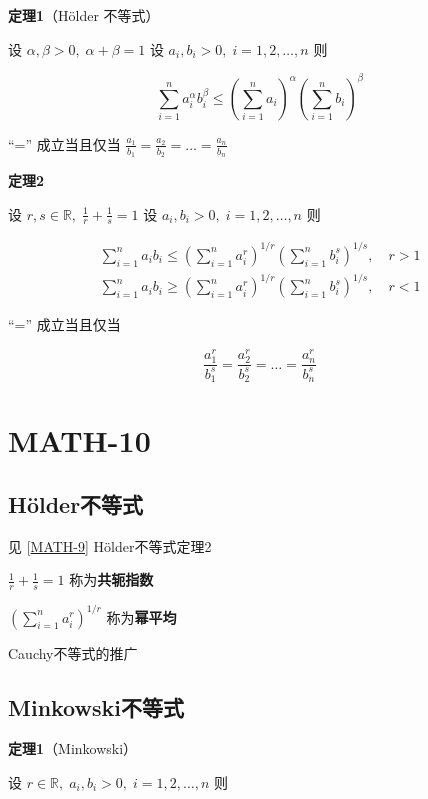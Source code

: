 \textbf{定理1}（Hölder 不等式）

设 \(\alpha,\beta >0, \; \alpha + \beta =1\) 设
\(a_{i}, b_{i}>0, \; i=1, 2, \dots , n\) 则

\[
\sum_{i=1}^{n}a_{i}^{\alpha}b_{i}^{\beta}\leq \left( \sum_{i=1}^{n}a_{i} \right)^{\alpha}\left( \sum_{i=1}^{n}b_{i} \right)^{\beta}
\]

``='' 成立当且仅当
\(\frac{a_{1}}{b_{1}}=\frac{a_{2}}{b_{2}}=\dots=\frac{a_{n}}{b_{n}}\)

\textbf{定理2}

设 \(r,s \in \mathbb{R}, \; \frac{1}{r}+\frac{1}{s}=1\) 设
\(a_{i},b_{i}>0, \; i=1,2,\dots,n\) 则

\[
\begin{aligned}
\sum_{i=1}^{n}a_{i}b_{i}\leq\left( \sum_{i=1}^{n}a_{i}^{r} \right)^{1/r}\left( \sum_{i=1}^{n}b_{i}^{s} \right)^{1/s}, \quad r>1 \\
\sum_{i=1}^{n}a_{i}b_{i}\geq\left( \sum_{i=1}^{n}a_{i}^{r} \right)^{1/r}\left( \sum_{i=1}^{n}b_{i}^{s} \right)^{1/s}, \quad r<1
\end{aligned}
\]

``='' 成立当且仅当

\[
\frac{a_{1}^{r}}{b_{1}^{s}}=\frac{a_{2}^{r}}{b_{2}^{s}}=\dots=\frac{a_{n}^{r}}{b_{n}^{s}}
\]

\section{MATH-10}\label{math-10}

\subsection{Hölder不等式}\label{huxf6lderux4e0dux7b49ux5f0f-1}

见 {[}\hyperref[math-9]{MATH-9}{]} Hölder不等式定理2

\(\frac{1}{r}+\frac{1}{s}=1\) 称为\textbf{共轭指数}

\(\left( \sum_{i=1}^{n}a_{i}^{r} \right)^{1/r}\) 称为\textbf{幂平均}

Cauchy不等式的推广

\subsection{Minkowski不等式}\label{minkowskiux4e0dux7b49ux5f0f}

\textbf{定理1}（Minkowski）

设 \(r\in \mathbb{R}, \; a_{i}, b_{i} > 0, \; i = 1, 2, \dots , n\) 则


